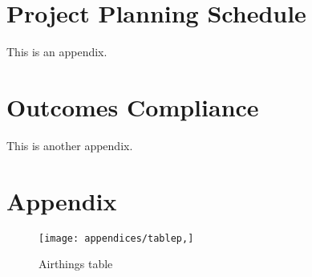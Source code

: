 \chapter{Project Planning Schedule}
\makeatletter{}\makeatother
\label{appen:appa}



This is an appendix.

\chapter{Outcomes Compliance}
\makeatletter{}\makeatother
\label{appen:appb}

This is another appendix.

\chapter{Appendix}
\makeatletter{}\makeatother

\begin{figure}[!htb]
	\centering
	\texttt{[image: appendices/tablep,]}
	\caption{Airthings table}
	\label{fig:airthingstableappc}
\end{figure}
